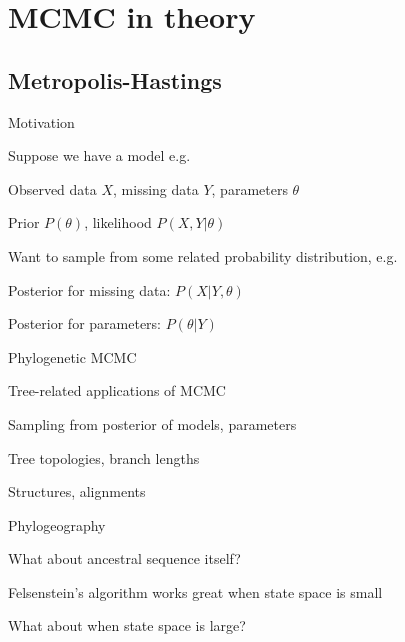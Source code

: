 \documentclass{beamer}
\begin{document}
\section{MCMC in theory}

\subsection{Metropolis-Hastings}


\begin{frame}{Motivation}

\itemb
\item Suppose we have a model e.g.
\itemb
\item Observed data $X$, missing data $Y$, parameters $\theta$
\item Prior $P(\theta)$, likelihood $P(X,Y|\theta)$
\iteme
\item Want to sample from some related probability distribution, e.g.
\itemb
\item Posterior for missing data: $P(X|Y,\theta)$
\item Posterior for parameters: $P(\theta|Y)$
\iteme
\iteme

\end{frame}

\begin{frame}{Phylogenetic MCMC}

Tree-related applications of MCMC
\itemb
\item Sampling from posterior of models, parameters
 \itemb
 \item Tree topologies, branch lengths
 \item Structures, alignments
 \item Phylogeography
 \iteme
\item What about ancestral sequence itself?
 \itemb
 \item Felsenstein's algorithm works great when state space is small
 \item What about when state space is large?
 \iteme
\iteme

\end{frame}
\end{document}
